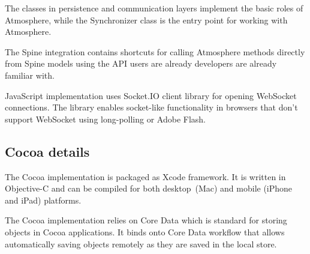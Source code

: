The classes in persistence and communication layers implement the basic roles of Atmosphere, while the Synchronizer class is the entry point for working with Atmosphere.

The Spine integration contains shortcuts for calling Atmosphere methods directly from Spine models using the API users are already developers are already familiar with.

JavaScript implementation uses Socket.IO \citep{socketio} client library for opening WebSocket connections. The library enables socket-like functionality in browsers that don't support WebSocket using long-polling or Adobe Flash.

\subsection{Cocoa details}

The Cocoa implementation is packaged as Xcode framework. It is written in Objective-C and can be compiled for both desktop (Mac) and mobile (iPhone and iPad) platforms.

The Cocoa implementation relies on Core Data which is standard for storing objects in Cocoa applications. It binds onto Core Data workflow that allows automatically saving objects remotely as they are saved in the local store.